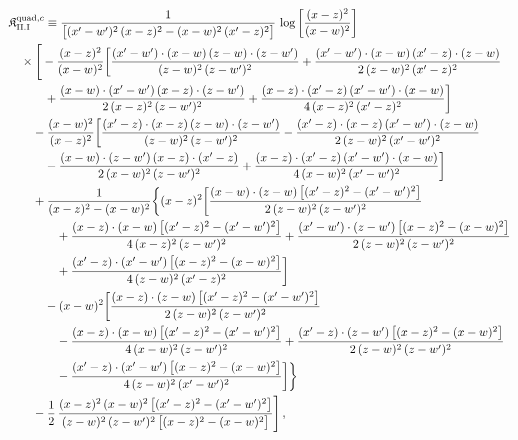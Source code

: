 \begingroup\small
\begin{align}\label{eq:K-rm_quad_c_rm_II_I}
&\mathfrak{K}^{{\rm quad},c}_{\rm II.I}\equiv \frac{1}{\big[(x'-w')^{2}\,(x-z)^{2}-(x-w)^{2}\,(x'-z)^{2}\big]}\, \log\left[\frac{(x-z)^{2}}{(x-w)^{2}}\right]\notag\\
&\quad \times\Bigg[-\frac{(x-z)^{2}}{(x-w)^{2}}\bigg[\frac{(x'-w')\cdot(x-w)\,(z-w)\cdot(z-w')}{(z-w)^{2}\,(z-w')^{2}} +\frac{(x'-w')\cdot(x-w)\,(x'-z)\cdot(z-w)}{2\,(z-w)^{2}\,(x'-z)^{2}}\notag\\
&\quad\quad\quad +\frac{(x-w)\cdot(x'-w')\,(x-z)\cdot(z-w')}{2\,(x-z)^{2}\,(z-w')^{2}} +\frac{(x-z)\cdot(x'-z)\,(x'-w')\cdot(x-w)}{4\,(x-z)^{2}\,(x'-z)^{2}}\bigg]\notag\\
&\quad\quad -\frac{(x-w)^{2}}{(x-z)^{2}}\bigg[\frac{(x'-z)\cdot(x-z)\,(z-w)\cdot(z-w')}{(z-w)^{2}\,(z-w')^{2}} -\frac{(x'-z)\cdot(x-z)\,(x'-w')\cdot(z-w)}{2\,(z-w)^{2}\,(x'-w')^{2}}\notag\\
&\quad\quad\quad -\frac{(x-w)\cdot(z-w')\,(x-z)\cdot(x'-z)}{2\,(x-w)^{2}\,(z-w')^{2}} +\frac{(x-z)\cdot(x'-z)\,(x'-w')\cdot(x-w)}{4\,(x-w)^{2}\,(x'-w')^{2}}\bigg]\notag\\
&\quad\quad +\frac{1}{(x-z)^{2}-(x-w)^{2}}\bigg\{(x-z)^{2}\bigg[\frac{(x-w)\cdot(z-w)\,\big[(x'-z)^{2}-(x'-w')^{2}\big]}{2\,(z-w)^{2}\,(z-w')^{2}}\notag\\
&\quad\quad\quad\quad +\frac{(x-z)\cdot(x-w)\,\big[(x'-z)^{2}-(x'-w')^{2}\big]}{4\,(x-z)^{2}\,(z-w')^{2}} +\frac{(x'-w')\cdot(z-w')\,\big[(x-z)^{2}-(x-w)^{2}\big]}{2\,(z-w)^{2}\,(z-w')^{2}}\notag\\
&\quad\quad\quad\quad +\frac{(x'-z)\cdot(x'-w')\,\big[(x-z)^{2}-(x-w)^{2}\big]}{4\,(z-w)^{2}\,(x'-z)^{2}}\bigg]\notag\\
&\quad\quad\quad -(x-w)^{2}\bigg[\frac{(x-z)\cdot(z-w)\,\big[(x'-z)^{2}-(x'-w')^{2}\big]}{2\,(z-w)^{2}\,(z-w')^{2}}\notag\\
&\quad\quad\quad\quad -\frac{(x-z)\cdot(x-w)\,\big[(x'-z)^{2}-(x'-w')^{2}\big]}{4\,(x-w)^{2}\,(z-w')^{2}} +\frac{(x'-z)\cdot(z-w')\,\big[(x-z)^{2}-(x-w)^{2}\big]}{2\,(z-w)^{2}\,(z-w')^{2}}\notag\\
&\quad\quad\quad\quad -\frac{(x'-z)\cdot(x'-w')\,\big[(x-z)^{2}-(x-w)^{2}\big]}{4\,(z-w)^{2}\,(x'-w')^{2}}\bigg]\bigg\}\notag\\
&\quad\quad -\frac{1}{2}\, \frac{(x-z)^{2}\,(x-w)^{2}\,\big[(x'-z)^{2}-(x'-w')^{2}\big]}{(z-w)^{2}\,(z-w')^{2}\,\big[(x-z)^{2}-(x-w)^{2}\big]}\Bigg]\,,
\end{align}
\endgroup

